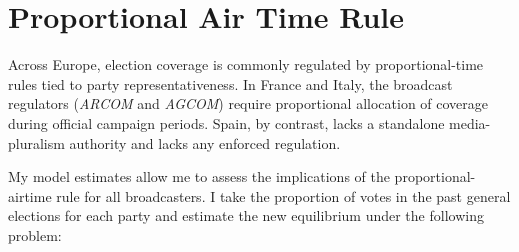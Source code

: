 \documentclass[12pt]{article}
\begin{document}







\FloatBarrier










\section{Proportional Air Time Rule}

\label{sec:counter}


Across Europe, election coverage is commonly regulated by proportional-time rules tied to party representativeness. In France and Italy, the broadcast regulators (\textit{ARCOM} and \textit{AGCOM}) require proportional allocation of coverage during official campaign periods. Spain, by contrast,  lacks a standalone media-pluralism authority and lacks any enforced regulation. 






My model estimates allow me to assess the  implications of the proportional-airtime rule for all broadcasters.  I take the proportion of votes in the past general elections for each party and estimate the new equilibrium under the following problem: 
\end{document}
